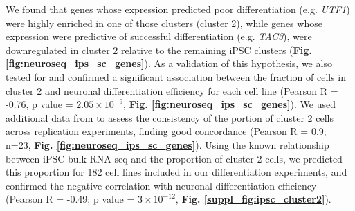 We found that genes whose expression predicted poor differentiation (e.g. \textit{UTF1}) were highly enriched in one of those clusters (cluster 2), while genes whose expression were predictive of successful differentiation (e.g. \textit{TAC3}), were downregulated in cluster 2 relative to the remaining iPSC clusters (\textbf{Fig. \ref{fig:neuroseq_ips_sc_genes}}). 
As a validation of this hypothesis, we also tested for and confirmed a significant association between the fraction of cells in cluster 2 and neuronal differentiation efficiency for each cell line (Pearson R = -0.76, p value = $2.05 \times 10^{-9}$, \textbf{Fig. \ref{fig:neuroseq_ips_sc_genes}}). 
We used additional data from \cite{cuomo2020single} to assess the consistency of the portion of cluster 2 cells across replication experiments, finding good concordance (Pearson R = 0.9; n=23, \textbf{Fig. \ref{fig:neuroseq_ips_sc_genes}}).
Using the known relationship between iPSC bulk RNA-seq and the proportion of cluster 2 cells, we predicted this proportion for 182 cell lines included in our differentiation experiments, and confirmed the negative correlation with neuronal differentiation efficiency (Pearson R = -0.49; p value = $3 \times 10^{-12}$, \textbf{Fig. \ref{suppl_fig:ipsc_cluster2}}). \\

